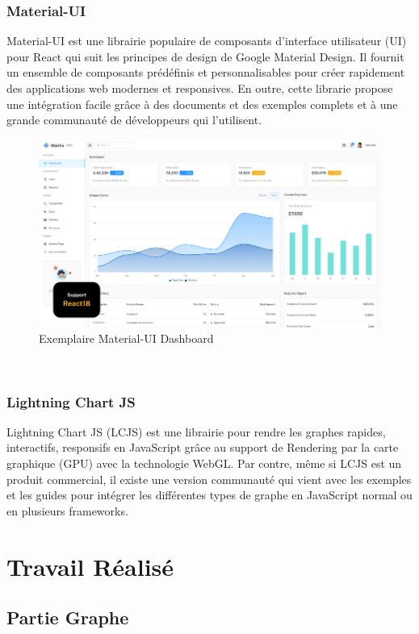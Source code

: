 \documentclass{template}
\begin{document}
\subsubsection{Material-UI}
Material-UI est une librairie populaire de composants d'interface utilisateur (UI) pour React qui suit les principes de design de Google Material Design. Il fournit un ensemble de composants prédéfinis et personnalisables pour créer rapidement des applications web modernes et responsives. En outre, cette librarie propose une intégration facile grâce à des documents et des exemples complets et à une grande communauté de développeurs qui l'utilisent.
\begin{figure}[h!]
    \includegraphics[scale=0.3]{Pics/mantis.png}
    \centering
    \caption{Exemplaire Material-UI Dashboard \cite{muiMantisFree}}
\end{figure}
\\
\subsubsection{Lightning Chart JS}
Lightning Chart JS (LCJS) \cite{lightningchartWorldsFastest} est une librairie pour rendre les graphes rapides, interactifs, responsifs en JavaScript grâce au support de Rendering par la carte graphique (GPU) avec la technologie WebGL. Par contre, même si LCJS est un produit commercial, il existe une version communauté qui vient avec les exemples et les guides pour intégrer les différentes types de graphe en JavaScript normal ou en plusieurs frameworks.
\section{Travail Réalisé}
\subsection{Partie Graphe}
\end{document}
